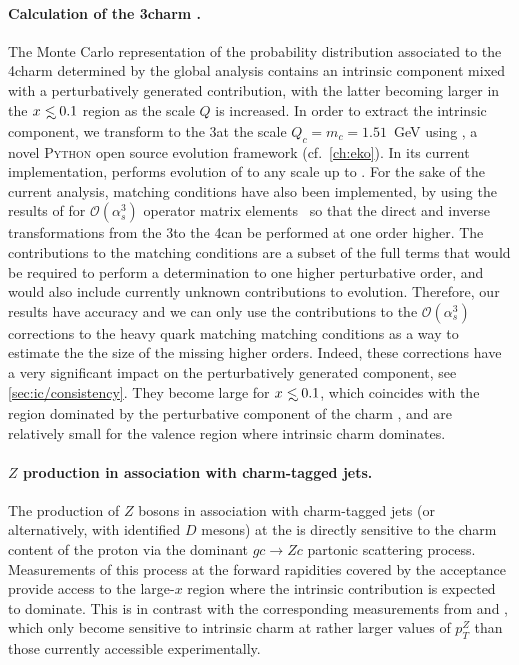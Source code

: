 \paragraph{Calculation of the 3\fns charm \pdf.}
%
The Monte Carlo representation of the probability distribution associated to
the 4\fns charm \pdf determined by the global analysis contains an intrinsic
component mixed with a perturbatively generated contribution, with the latter
becoming larger in the $x\lsim 0.1$ region as the scale $Q$ is increased.
%
In order to extract the intrinsic component, we transform \pdfs to the 3\fns at
the scale $Q_c=m_c=1.51$~GeV using \eko, a novel \textsc{\small Python} open
source \pdf evolution framework (cf.\ \cref{ch:eko}).
%
In its current implementation, \eko performs  \qcd  evolution of \pdfs to any
scale up to \nnlo. 
For the sake of the current analysis, \nnnlo matching conditions have also been
implemented, by  using  the results of
\cite{Bierenbaum:2009zt,Bierenbaum:2009mv,Ablinger:2010ty,Ablinger:2014vwa,Ablinger:2014uka,Behring:2014eya,Ablinger_2014,Ablinger:2014nga,Blumlein:2017wxd}
for $\mathcal{O}(\alpha_s^3)$ operator matrix elements~ so that the direct and
inverse transformations from the 3\fns to the 4\fns can be performed at one
order higher.
%
The \nnnlo contributions to the matching conditions are a subset of the full
\nnnlo terms that would be required to perform a \pdf determination to one
higher perturbative order, and would also include currently unknown \nnnlo
contributions to \qcd evolution. 
Therefore, our results have  \nnlo accuracy and we can only use the  \nnnlo
contributions to the $\mathcal{O}(\alpha_s^3)$ corrections to the heavy quark
matching matching conditions as a way to estimate the  the size of the missing
higher orders. 
Indeed, these corrections have a very  significant impact on the perturbatively
generated component, see \cref{sec:ic/consistency}.
%
They become large for $x \lsim 0.1$, which coincides with the region dominated
by the perturbative component of the charm \pdf, and are relatively small for
the valence region where intrinsic charm dominates.
  
\paragraph{$Z$ production in association with charm-tagged jets.}
%
The production of $Z$ bosons in association with charm-tagged jets (or
alternatively, with identified $D$ mesons) at the \lhc is directly sensitive to
the charm content of the proton via the dominant $gc \to Zc$ partonic
scattering process.
%
Measurements of this process at  the forward rapidities covered by the \lhcb
acceptance provide access to the large-$x$ region where the intrinsic 
contribution is expected to dominate.
%
This is in contrast with the corresponding measurements from \atlas and \cms,
which only become sensitive to intrinsic charm at rather larger values of
$p_T^Z$ than those currently accessible experimentally.

